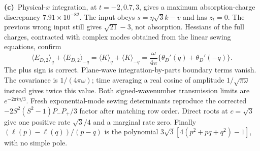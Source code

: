 \documentclass[11pt,a4paper]{article}
\newcommand{\Lc}{\textbf{(c)}\ }
\begin{document}
\Lc Physical-$x$ integration, at $t=-2,0.7,3$, gives a maximum
absorption-charge discrepancy $7.91\times10^{-82}$. The input obeys
$s=\eta\sqrt3k-v$ and has $z_t=0$. The previous wrong input still gives
$\sqrt{21}-3$, not absorption. Hessians of the full charges, contracted with
complex modes obtained from the linear sewing equations, confirm
\begin{equation}
 \langle E_{D,2}\rangle_q+\langle E_{D,2}\rangle_{-q}
 =\langle K\rangle_q+\langle K\rangle_{-q}
 =\frac{\omega}{4\pi}\{\theta_D'(q)+\theta_D'(-q)\}.
 \label{eq:plus}
\end{equation}
The plus sign is correct. Plane-wave integration-by-parts boundary terms
vanish. The covariance is $1/(4\pi\omega)$; time averaging a real cosine
of amplitude $1/\sqrt{\pi\omega}$ instead gives twice this value.
Both signed-wavenumber transmission limits are $e^{-2\pi i\eta/3}$.
Fresh exponential-mode sewing determinants reproduce the corrected
$-2S^2(S^2-1)P_-P_+/3$ factor after matching row order. Direct roots at
$c=\sqrt3$ give one positive rate $\sqrt3/4$ and a marginal rate zero.
Finally $(\ell(p)-\ell(q))/(p-q)$ is the polynomial
$3\sqrt3[4(p^2+pq+q^2)-1]$, with no simple pole.
\end{document}
